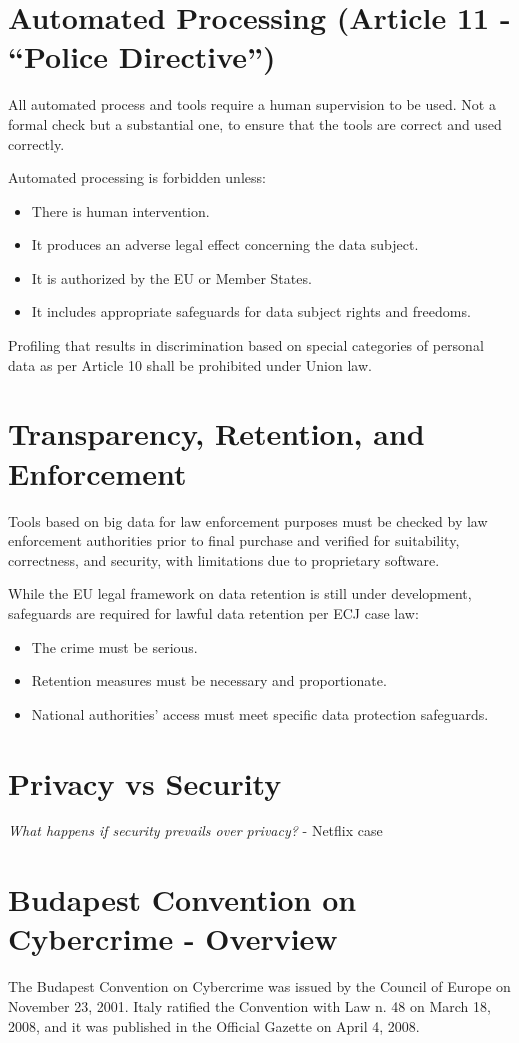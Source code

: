 \section{Automated Processing (Article 11 - “Police Directive”)}

All automated process and tools require a human supervision to be
used. Not a formal check but a substantial one, to ensure that the
tools are correct and used correctly.

Automated processing is forbidden unless:
\begin{itemize}
    \item There is human intervention.
    \item It produces an adverse legal effect concerning the data subject.
    \item It is authorized by the EU or Member States.
    \item It includes appropriate safeguards for data subject rights
      and freedoms.
\end{itemize}

Profiling that results in discrimination based on special categories
of personal data as per Article 10 shall be prohibited under Union
law.

\section{Transparency, Retention, and Enforcement}

Tools based on big data for law enforcement purposes must be checked
by law enforcement authorities prior to final purchase and verified
for suitability, correctness, and security, with limitations due to
proprietary software.

While the EU legal framework on data retention is still under
development, safeguards are required for lawful data retention per ECJ
case law:
\begin{itemize}
    \item The crime must be serious.
    \item Retention measures must be necessary and proportionate.
    \item National authorities’ access must meet specific data
      protection safeguards.
\end{itemize}

\section{Privacy vs Security}

\textit{What happens if security prevails over privacy?} - Netflix
case

\section{Budapest Convention on Cybercrime - Overview}

The Budapest Convention on Cybercrime was issued by the Council of
Europe on November 23, 2001.  
Italy ratified the Convention with Law n. 48 on March 18, 2008, and it
was published in the Official Gazette on April 4, 2008.
